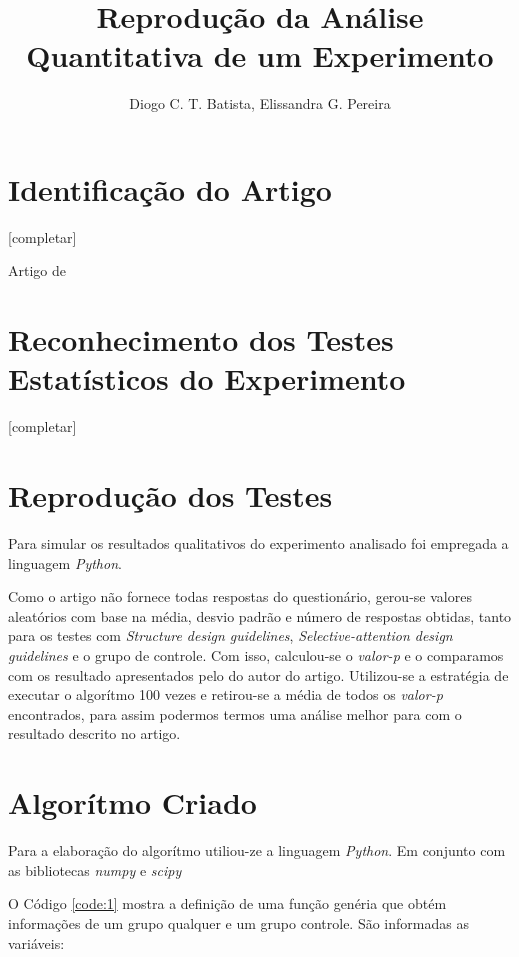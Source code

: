 \documentclass[12pt]{article}
\title{Reprodução da Análise Quantitativa de um Experimento}
\author{Diogo C. T. Batista\inst{1}, Elissandra G. Pereira\inst{1}}
\begin{document}
\maketitle

\begin{resumo}
 [completar]
\end{resumo}

\section{Identificação do Artigo}

[completar]

Artigo de \cite{JIN2013248}

\section{Reconhecimento dos Testes Estatísticos do Experimento}

[completar]

\section{Reprodução dos Testes}

Para simular os resultados qualitativos do experimento analisado foi empregada a linguagem \textit{Python}. 

Como o artigo não fornece todas respostas do questionário, gerou-se valores aleatórios com base na média, desvio padrão e número de respostas obtidas, tanto para os testes com \textit{Structure design guidelines}, \textit{Selective-attention design guidelines} e o grupo de controle. Com isso, calculou-se o \textit{valor-p} e o comparamos com os resultado apresentados pelo do autor do artigo. Utilizou-se a estratégia de executar o algorítmo 100 vezes e retirou-se a média de todos os \textit{valor-p} encontrados, para assim podermos termos uma análise melhor para com o resultado descrito no artigo.

\section{Algorítmo Criado}

Para a elaboração do algorítmo utiliou-ze a linguagem \textit{Python}. Em conjunto com as bibliotecas \textit{numpy} e \textit{scipy}

O Código \ref{code:1} mostra a definição de uma função genéria que obtém informações de um grupo qualquer e um grupo controle. São informadas as variáveis:
\end{document}
